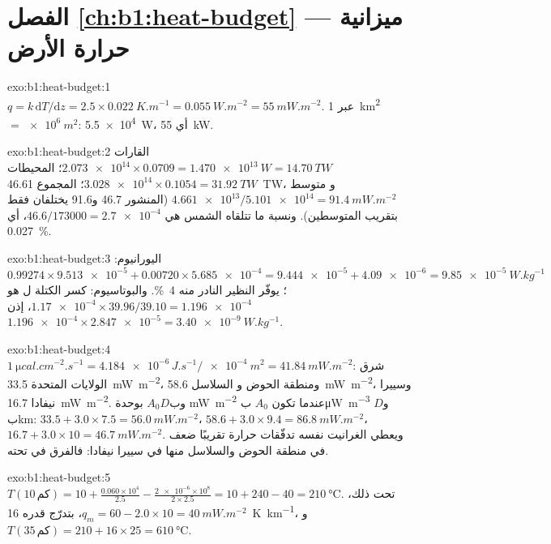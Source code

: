 \section*{الفصل \ref{ch:b1:heat-budget} --- ميزانية حرارة الأرض}

\begin{solution}{exo:b1:heat-budget:1}
$q = k\,\mathrm dT/\mathrm dz = 2.5\times\qty{0.022}{K.m^{-1}} =
\qty{0.055}{W.m^{-2}} = \qty{55}{mW.m^{-2}}$. عبر \qty{1}{km^2} $=
\qty{e6}{m^2}$: \qty{5.5e4}{W}، أي \qty{55}{kW}.
\end{solution}

\begin{solution}{exo:b1:heat-budget:2}
القارات $\num{2.073e14}\times0.0709 = \qty{1.470e13}{W} = \qty{14.70}{TW}$؛
المحيطات $\num{3.028e14}\times0.1054 = \qty{31.92}{TW}$؛ المجموع \qty{46.61}{TW}، و
متوسط  $\num{4.661e13}/\num{5.101e14} = \qty{91.4}{mW.m^{-2}}$ (المنشور 46.7 و\num{91.6} يختلفان فقط بتقريب المتوسطين). ونسبة ما تتلقاه الشمس هي
$46.6/173000 = \num{2.7e-4}$، أي \qty{0.027}{\percent}.
\end{solution}

\begin{solution}{exo:b1:heat-budget:3}
اليورانيوم: $0.99274\times\num{9.513e-5} + 0.00720\times\num{5.685e-4} =
\num{9.444e-5} + \num{4.09e-6} = \qty{9.85e-5}{W.kg^{-1}}$؛ يوفّر النظير النادر
 منه \qty{4}{\percent}. والبوتاسيوم: كسر الكتلة ل هو $\num{1.17e-4}\times39.96/39.10 = \num{1.196e-4}$، إذن
$\num{1.196e-4}\times\num{2.847e-5} = \qty{3.40e-9}{W.kg^{-1}}$.
\end{solution}

\begin{solution}{exo:b1:heat-budget:4}
$\qty{1}{\micro cal.cm^{-2}.s^{-1}} = \num{4.184e-6}\,\unit{J.s^{-1}}/\qty{e-4}{m^2}
= \qty{41.84}{mW.m^{-2}}$: شرق الولايات المتحدة \qty{33.5}{mW.m^{-2}}، ومنطقة الحوض و
السلاسل \qty{58.6}{mW.m^{-2}}، وسييرا نيفادا \qty{16.7}{mW.m^{-2}}. وب$A_0D$ بوحدة
\unit{mW.m^{-2}} عندما تكون $A_0$ ب\unit{\micro W.m^{-3}} و$D$ ب\unit{km}:
$33.5 + 3.0\times7.5 = \qty{56.0}{mW.m^{-2}}$، $58.6 + 3.0\times9.4 =
\qty{86.8}{mW.m^{-2}}$، $16.7 + 3.0\times10 = \qty{46.7}{mW.m^{-2}}$. ويعطي الغرانيت نفسه تدفّقات حرارة تقريبًا ضعف في منطقة الحوض والسلاسل منها في سييرا نيفادا: فالفرق في  تحته.
\end{solution}

\begin{solution}{exo:b1:heat-budget:5}
$T(10\,\text{كم}) = 10 + \frac{0.060\times10^4}{2.5} - \frac{\num{2e-6}\times10^8}{2\times2.5}
= 10 + 240 - 40 = \qty{210}{\degreeCelsius}$. تحت ذلك، $q_m = 60 - 2.0\times10 =
\qty{40}{mW.m^{-2}}$، بتدرّج قدره \qty{16}{K.km^{-1}}، و
$T(35\,\text{كم}) = 210 + 16\times25 = \qty{610}{\degreeCelsius}$.
\end{solution}

